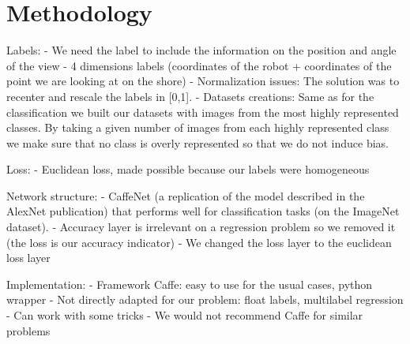 \section{Methodology}





Labels:
- We need the label to include the information on the position and angle of the view
- 4 dimensions labels (coordinates of the robot + coordinates of the point we are looking at on the shore)
- Normalization issues: The solution was to recenter and rescale the labels in [0,1].
- Datasets creations: Same as for the classification we built our datasets with images from the most highly represented classes. By taking a given number of images from each highly represented class we make sure that no class is overly represented so that we do not induce bias.

Loss:
- Euclidean loss, made possible because our labels were homogeneous

Network structure: 
- CaffeNet (a replication of the model described in the AlexNet publication) that performs well for classification tasks (on the ImageNet dataset).
- Accuracy layer is irrelevant on a regression problem so we removed it (the loss is our accuracy indicator)
- We changed the loss layer to the euclidean loss layer

Implementation:
- Framework Caffe: easy to use for the usual cases, python wrapper
- Not directly adapted for our problem: float labels, multilabel regression
- Can work with some tricks
- We would not recommend Caffe for similar problems
